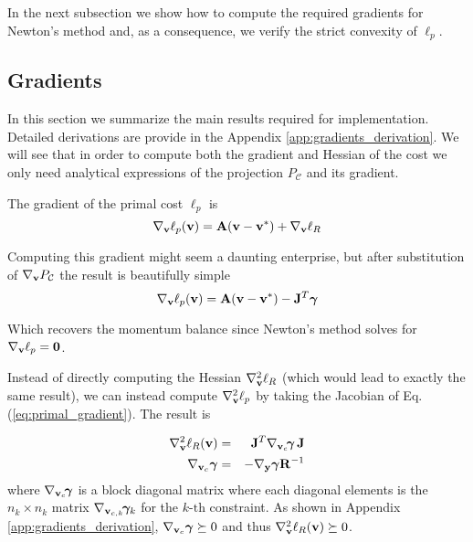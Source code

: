 In the next subsection we show how to compute the required gradients for
Newton's method and, as a consequence, we verify the strict convexity of
$\ell_p$.


\subsection{Gradients}
\label{sec:gradients}

In this section we summarize the main results required for implementation.
Detailed derivations are provide in the Appendix \ref{app:gradients_derivation}.
We will see that in order to compute both the gradient and Hessian of the cost
we only need analytical expressions of the projection $P_\mathcal{C}$ and its
gradient.

The gradient of the primal cost $\ell_p$ is
\begin{equation}
	\nabla_{\mathbf{v}}\ell_p({\mathbf{v}}) = {\mathbf{A}}({\mathbf{v}}-{\mathbf{v}}^*) + \nabla_{\mathbf{v}}\ell_R
\end{equation}

Computing this gradient might seem a daunting enterprise, but after substitution
of $\nabla_{\mathbf{v}}P_\mathcal{C}$ the result is beautifully simple
\begin{equation}
	\nabla_\mf{v}\ell_p(\mf{v}) = \mf{A}(\mf{v}-\mf{v}^*) - \mf{J}^T\bgamma
	\label{eq:primal_gradient}
\end{equation}

Which recovers the momentum balance since Newton's method solves for
$\nabla_{\mathbf{v}}\ell_p={\mathbf{0}}$.

Instead of directly computing the Hessian $\nabla_{\mathbf{v}}^2\ell_R$ (which would
lead to exactly the same result), we can instead compute $\nabla_{\mathbf{v}}^2\ell_p$
by taking the Jacobian of Eq. (\ref{eq:primal_gradient}). The result is


\begin{eqnarray}
	\nabla_\mf{v}^2\ell_R(\mf{v}) &=&
	\mf{J}^T\nabla_{\mf{v}_c}\!\bgamma\,\mf{J}\nonumber\\
	\nabla_{\mf{v}_c}\bgamma &=& -\nabla_\mf{y}\bgamma \mf{R}^{-1}
	\label{eq:ellR_hessian}
\end{eqnarray}
where $\nabla_{{\mathbf{v}}_c}\!{\bm\gamma}$ is a block diagonal matrix where each
diagonal elements is the $n_k\times n_k$ matrix
$\nabla_{{\mathbf{v}}_{c,k}}\!{\bm\gamma}_k$ for the $k\text{-th}$ constraint. As shown in
Appendix \ref{app:gradients_derivation}, $\nabla_{{\mathbf{v}}_c}{\bm\gamma}\succeq 0$ and
thus $\nabla_{\mathbf{v}}^2\ell_R({\mathbf{v}})\succeq 0$.



